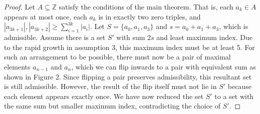 \documentclass{article}
\theoremstyle{definition}
\newcommand{\Z}{\mathbb{Z}}
\begin{document}
\begin{proof}
    Let $A \subseteq \Z$ satisfy the conditions of the main theorem. That is, each $a_k \in A$ appears at most once, each $a_k$ is in exactly two zero triples, and $|a_{3k+1}|,|a_{3k+2}| \geq \sum_{i=1}^{3k}|a_i|$. Let $S = \{a_0,a_1,a_3\}$ and $s = a_0 + a_1 + a_3$, which is admissible. Assume there is a set $S'$ with sum $2s$ and least maximum index. Due to the rapid growth in assumption 3, this maximum index must be at least 5. For such an arrangement to be possible, there must now be a pair of maximal elements $a_{n-1}$ and $a_n$, which we can flip inwards to a pair with equivalent sum as shown in Figure 2. Since flipping a pair preserves admissibility, this resultant set is still admissible. However, the result of the flip itself must not lie in $S'$ because each element appears exactly once. We have now reduced the set $S'$ to a set with the same sum but smaller maximum index, contradicting the choice of $S'$.
    \end{proof}
\end{document}
